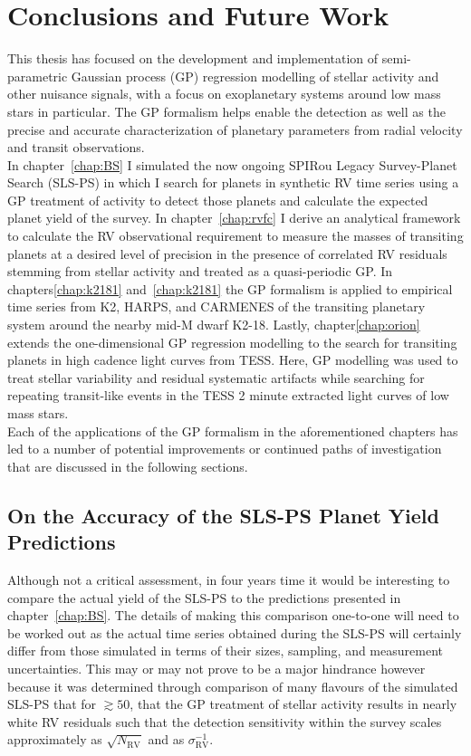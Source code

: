 \chapter{Conclusions and Future Work}

This thesis has focused on the development and implementation of
semi-parametric Gaussian process (GP) regression modelling of stellar activity
and other nuisance signals, with a focus on exoplanetary systems around low mass
stars in particular. The GP formalism helps enable the detection as
well as the precise and accurate characterization of planetary parameters
from radial velocity and transit observations. \\

In chapter~\ref{chap:BS} I simulated the
now ongoing SPIRou Legacy Survey-Planet Search (SLS-PS)
in which I search for planets
in synthetic RV time series using a GP treatment of activity to detect
those planets and calculate the expected planet yield of the survey. In
chapter~\ref{chap:rvfc} I derive an analytical framework to calculate the
RV observational requirement to measure the masses of transiting planets at
a desired level of precision in the presence of correlated RV residuals stemming
from stellar activity and treated as a quasi-periodic GP.
In chapters\ref{chap:k2181} and~\ref{chap:k2181} the GP formalism is
applied to empirical time series from K2, HARPS, and CARMENES of the transiting
planetary system around the nearby mid-M dwarf K2-18. Lastly,
chapter\ref{chap:orion} extends the one-dimensional GP regression modelling to
the search for transiting planets in high cadence light curves from TESS. Here,
GP modelling was used to treat stellar variability and residual systematic
artifacts while searching for repeating transit-like events in the TESS 2 minute
extracted light curves of low mass stars. \\

Each of the applications of the GP formalism in the aforementioned chapters
has led to a number of potential improvements or continued paths of investigation
that are discussed in the following sections.

\section{On the Accuracy of the SLS-PS Planet Yield Predictions}
Although not a critical assessment, in four years time it would be interesting
to compare the actual yield of the SLS-PS to the predictions presented in
chapter~\ref{chap:BS}. The details of making this comparison one-to-one will
need to be worked out as the actual time series obtained during the SLS-PS will
certainly differ from those simulated in terms of their sizes, sampling, and
measurement uncertainties. This may or may not prove to be a major hindrance
however because it was determined through comparison of many flavours of the
simulated SLS-PS that for \nrv{} $\gtrsim 50$, that the GP treatment of stellar
activity results in nearly white RV residuals such that the detection
sensitivity within the survey scales approximately as $\sqrt{N_{\text{RV}}}$ and
as $\sigma_{\text{RV}}^{-1}$. \\

